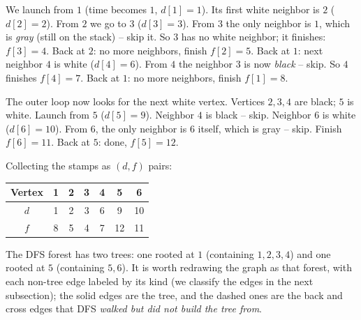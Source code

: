 We launch from $1$ (time becomes $1$, $d[1]=1$). Its first white neighbor is
$2$ ($d[2]=2$). From $2$ we go to $3$ ($d[3]=3$). From $3$ the only neighbor is
$1$, which is \emph{gray} (still on the stack) -- skip it. So $3$ has no white
neighbor; it finishes: $f[3]=4$. Back at $2$: no more neighbors, finish
$f[2]=5$. Back at $1$: next neighbor $4$ is white ($d[4]=6$). From $4$ the
neighbor $3$ is now \emph{black} -- skip. So $4$ finishes $f[4]=7$. Back at $1$:
no more neighbors, finish $f[1]=8$.

The outer loop now looks for the next white vertex. Vertices $2,3,4$ are black;
$5$ is white. Launch from $5$ ($d[5]=9$). Neighbor $4$ is black -- skip.
Neighbor $6$ is white ($d[6]=10$). From $6$, the only neighbor is $6$ itself,
which is gray -- skip. Finish $f[6]=11$. Back at $5$: done, $f[5]=12$.

Collecting the stamps as $(d, f)$ pairs:
\begin{center}
\begin{tabular}{ccccccc}
\toprule
Vertex & 1 & 2 & 3 & 4 & 5 & 6 \\
\midrule
$d$ & 1 & 2 & 3 & 6 & 9 & 10 \\
$f$ & 8 & 5 & 4 & 7 & 12& 11 \\
\bottomrule
\end{tabular}
\end{center}

The DFS forest has two trees: one rooted at $1$ (containing $1,2,3,4$) and one
rooted at $5$ (containing $5,6$). It is worth redrawing the graph as that
forest, with each non-tree edge labeled by its kind (we classify the edges in
the next subsection); the solid edges are the tree, and the dashed ones are the
back and cross edges that DFS \emph{walked but did not build the tree from}.

\begin{center}
\end{center}


